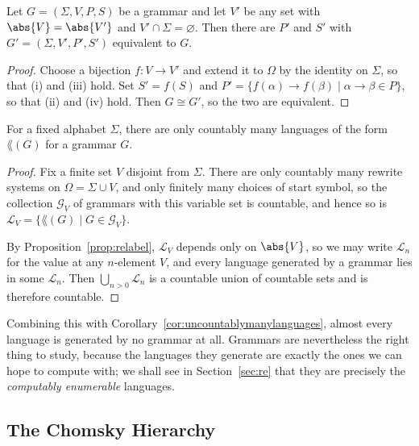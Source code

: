 \begin{proposition}\label{prop:relabel}
	Let $G = (\Sigma, V, P, S)$ be a grammar and let $V'$ be any set with $\abs{V} = \abs{V'}$ and $V' \cap \Sigma = \varnothing$. Then there are $P'$ and $S'$ with $G' = (\Sigma, V', P', S')$ equivalent to $G$.
\end{proposition}

\begin{proof}
	Choose a bijection $f \colon V \to V'$ and extend it to $\Omega$ by the identity on $\Sigma$, so that (i) and (iii) hold. Set $S' = f(S)$ and $P' = \{f(\alpha) \to f(\beta) \mid \alpha \to \beta \in P\}$, so that (ii) and (iv) hold. Then $G \cong G'$, so the two are equivalent.
\end{proof}

\begin{proposition}\label{prop:countablymanygrammarlanguages}
	For a fixed alphabet $\Sigma$, there are only countably many languages of the form $\lang(G)$ for a grammar $G$.
\end{proposition}

\begin{proof}
	Fix a finite set $V$ disjoint from $\Sigma$. There are only countably many rewrite systems on $\Omega = \Sigma \cup V$, and only finitely many choices of start symbol, so the collection $\mathcal{G}_V$ of grammars with this variable set is countable, and hence so is $\mathcal{L}_V = \{\lang(G) \mid G \in \mathcal{G}_V\}$.

	By Proposition~\ref{prop:relabel}, $\mathcal{L}_V$ depends only on $\abs{V}$, so we may write $\mathcal{L}_n$ for the value at any $n$-element $V$, and every language generated by a grammar lies in some $\mathcal{L}_n$. Then $\bigcup_{n > 0} \mathcal{L}_n$ is a countable union of countable sets and is therefore countable.
\end{proof}

Combining this with Corollary~\ref{cor:uncountablymanylanguages}, almost every language is generated by no grammar at all. Grammars are nevertheless the right thing to study, because the languages they generate are exactly the ones we can hope to compute with; we shall see in Section~\ref{sec:re} that they are precisely the \emph{computably enumerable} languages.

\subsection{The Chomsky Hierarchy}

